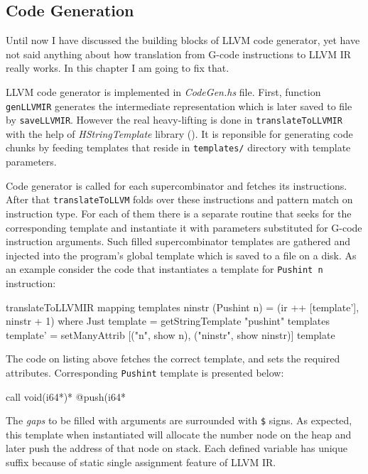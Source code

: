 \documentclass[12pt,a4paper]{report}
\begin{document}
\subsection{Code Generation}
Until now I have discussed the building blocks of LLVM code generator, yet
have not said anything about how translation from G-code instructions to LLVM IR
really works. In this chapter I am going to fix that.

LLVM code generator is implemented in \textit{CodeGen.hs} file. First, function
\texttt{genLLVMIR} generates the intermediate representation which is later
saved to file by \texttt{saveLLVMIR}. However the real heavy-lifting is done in
\texttt{translateToLLVMIR} with the help of \textit{HStringTemplate} library
(\cite{website:hstring_template}). It is reponsible for generating code chunks
by feeding templates that reside in \texttt{templates/} directory with template
parameters.

Code generator is called for each supercombinator and fetches its instructions.
After that \texttt{translateToLLVM} folds over these instructions and pattern
match on instruction type. For each of them there is a separate routine that
seeks for the corresponding template and instantiate it with parameters
substituted for G-code instruction arguments. Such filled supercombinator
templates are gathered and injected into the program's global template which is
saved to a file on a disk. As an example consider the code that instantiates a
template for \texttt{Pushint n} instruction:

\vspace*{0.2in}
\begin{code}[style=haskell]
translateToLLVMIR mapping templates ninstr (Pushint n) =
    (ir ++ [template'], ninstr + 1)
    where
        Just template = getStringTemplate "pushint" templates
        template' = setManyAttrib
                [("n", show n), ("ninstr", show ninstr)]
                template
\end{code}

The code on listing above fetches the correct template, and sets the required
attributes. Corresponding \texttt{Pushint} template is presented below:

\vspace*{0.2in}
\begin{code}[style=assembler]
call void(i64*)* @push(i64* %
\end{code}

The \textit{gaps} to be filled with arguments are surrounded with \texttt{\$}
signs. As expected, this template when instantiated will allocate the number
node on the heap and later push the address of that node on stack. Each defined
variable has unique suffix because of static single assignment feature of LLVM
IR.
\end{document}
